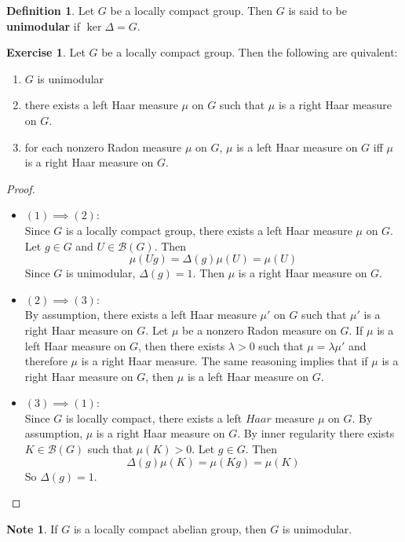 \documentclass[12pt]{amsart}
\theoremstyle{definition}
\newtheorem{defn}[definition]{Definition}
\newtheorem{note}[definition]{Note}
\newtheorem{ex}[definition]{Exercise}
\newcommand{\Del}{\Delta}
\newcommand{\lam}{\lambda}
\newcommand{\MB}{\mathcal{B}}
\newcommand{\lex}[1]{\label{ex:#1}}
\newcommand{\ld}[1]{\label{defn:#1}}
\begin{document}
	\begin{defn} \ld{00000} 
		Let $G$ be a locally compact group. Then $G$ is said to be \textbf{unimodular} if $\ker \Del = G$.  
	\end{defn}
	
	\begin{ex} \lex{00000} 
		Let $G$ be a locally compact group. Then the following are quivalent: 
		\begin{enumerate}
			\item $G$ is unimodular 
			\item there exists a left  Haar measure $\mu$ on $G$ such that $\mu$ is a right Haar measure on $G$.
			\item for each nonzero Radon measure $\mu$ on $G$, $\mu$ is a left Haar measure on $G$ iff $\mu$ is a right Haar measure on $G$.
		\end{enumerate}
	\end{ex}
	
	\begin{proof}\
		\begin{itemize}
			\item $(1) \implies (2)$:\\ Since $G$ is a locally compact group, there exists a left Haar measure $\mu$ on $G$. Let $g \in G$ and $U \in \MB(G)$. Then $$\mu(Ug) = \Del(g) \mu(U) = \mu(U)$$ Since $G$ is unimodular, $\Del(g) = 1$. Then $\mu$ is a right Haar measure on $G$. 
			\item $(2) \implies (3)$:\\ By assumption, there exists a left  Haar measure $\mu'$ on $G$ such that $\mu'$ is a right Haar measure on $G$. Let $\mu$ be a nonzero Radon measure on $G$. If $\mu$ is a left Haar measure on $G$, then there exists $\lam >0$ such that $\mu = \lam \mu'$ and therefore $\mu$ is a right Haar measure. The same reasoning implies that if $\mu$ is a right Haar measure on $G$, then $\mu$ is a left Haar measure on $G$.
			\item $(3) \implies (1)$: \\ Since $G$ is locally compact, there exists a left $Haar$ measure $\mu$ on $G$. By assumption, $\mu$ is a right Haar measure on $G$. By inner regularity there exists $K \in \MB(G)$ such that $\mu(K) > 0$. Let $g \in G$. Then $$\Del(g) \mu(K) = \mu(Kg) = \mu(K)$$ So $\Del(g) = 1$.
		\end{itemize}
	\end{proof}

	\begin{note}
		If $G$ is a locally compact abelian group, then $G$ is unimodular.
	\end{note}
	
\end{document}
